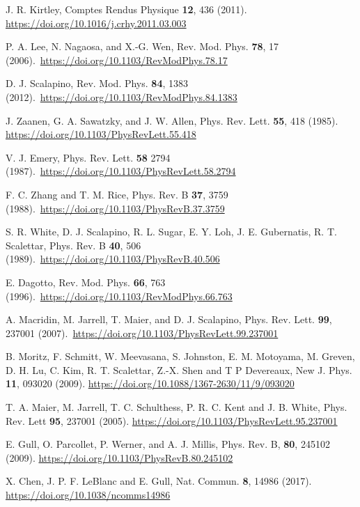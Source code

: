\documentclass[reprint,nofootinbib,nobibnotes,amsmath,amssymb,aps,prb,floatfix]{revtex4-2}
\begin{document}
\begin{thebibliography}{99}
J. R. Kirtley, Comptes Rendus Physique {\bf 12}, 436 (2011). \url{https://doi.org/10.1016/j.crhy.2011.03.003}

P. A. Lee, N. Nagaosa, and X.-G. Wen, Rev. Mod. Phys.  {\bf 78}, 17 (2006).~\url{https://doi.org/10.1103/RevModPhys.78.17}

D. J. Scalapino, Rev. Mod. Phys. {\bf 84}, 1383 (2012).~\url{https://doi.org/10.1103/RevModPhys.84.1383}

J. Zaanen, G. A. Sawatzky, and J. W. Allen, Phys. Rev. Lett. {\bf 55}, 418 (1985). 
\url{https://doi.org/10.1103/PhysRevLett.55.418}

 V. J. Emery, Phys. Rev. Lett. {\bf 58} 2794 (1987).~\url{https://doi.org/10.1103/PhysRevLett.58.2794}

 F. C. Zhang and T. M. Rice, Phys. Rev. B {\bf 37}, 3759 (1988).~\url{https://doi.org/10.1103/PhysRevB.37.3759}

S. R. White, D. J. Scalapino, R. L. Sugar, E. Y. Loh, J. E. Gubernatis, R. T. Scalettar, Phys. Rev. B {\bf 40}, 506 (1989).~\url{https://doi.org/10.1103/PhysRevB.40.506}

 E. Dagotto, Rev. Mod. Phys. {\bf 66}, 763 (1996).~\url{https://doi.org/10.1103/RevModPhys.66.763}

A. Macridin, M. Jarrell, T. Maier, and D. J. Scalapino, Phys. Rev. Lett. {\bf 99}, 237001 (2007).~\url{https://doi.org/10.1103/PhysRevLett.99.237001}

 B. Moritz, F. Schmitt, W. Meevasana, S. Johnston,
E. M. Motoyama, M. Greven, D. H. Lu, C. Kim,
R. T. Scalettar, Z.-X. Shen and T P Devereaux, New J. Phys.
{\bf 11}, 093020 (2009). \url{https://doi.org/10.1088/1367-2630/11/9/093020}

 T. A. Maier, M. Jarrell, T. C. Schulthess, P. R. C. Kent and J. B. White, Phys. Rev. Lett {\bf 95}, 237001 (2005). \url{https://doi.org/10.1103/PhysRevLett.95.237001}

E. Gull, O. Parcollet, P. Werner, and A. J. Millis, Phys. Rev. B, {\bf 80}, 245102 (2009). \url{https://doi.org/10.1103/PhysRevB.80.245102}

X. Chen, J. P. F. LeBlanc and E. Gull, Nat. Commun. {\bf 8}, 14986 (2017). 
\url{https://doi.org/10.1038/ncomms14986}


\end{thebibliography}
\end{document}

